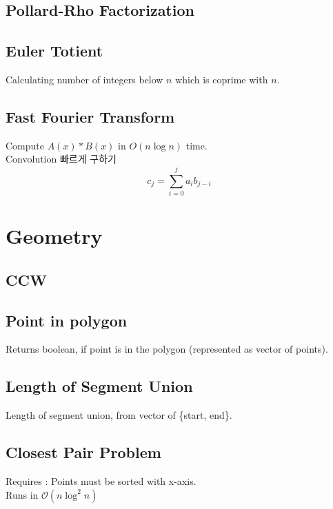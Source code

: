 \documentclass[landscape,8pt]{article}
\begin{document}
\begin{multicols}{2}
  \subsection{Pollard-Rho Factorization}
    

  \subsection{Euler Totient}
  Calculating number of integers below $n$ which is coprime with $n$.
    



  \subsection{Fast Fourier Transform}
    Compute $A(x) * B(x)$ in $O(n\log n)$ time.\\
    Convolution 빠르게 구하기 \[ c_j = \sum_{i = 0}^{j} a_i b_{j-i}\]
    
  \columnbreak
\columnbreak
\section{Geometry}
  \subsection{CCW}
    

  \subsection{Point in polygon}
    Returns boolean, if point is in the polygon (represented as vector of points).
    
  \subsection{Length of Segment Union}
    Length of segment union, from vector of \{start, end\}.
    
  \subsection{Closest Pair Problem}
    Requires : Points must be sorted with x-axis.\\
    Runs in $\mathcal{O}(n \log^2 n)$
    

\end{multicols}
\end{document}
